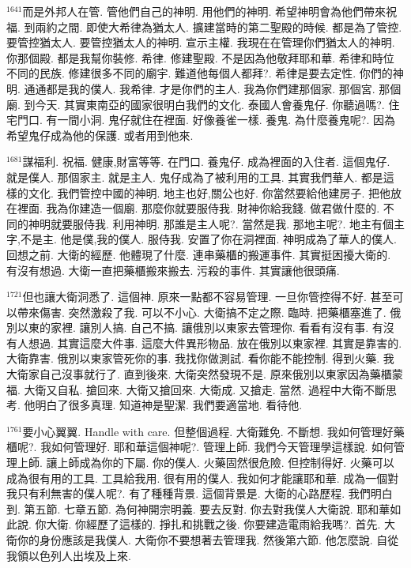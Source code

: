 \documentclass{book}
\begin{document}
$^{1641}$而是外邦人在管.
管他們自己的神明.
用他們的神明.
希望神明會為他們帶來祝福.
到兩約之間.
即使大希律為猶太人.
擴建當時的第二聖殿的時候.
都是為了管控.
要管控猶太人.
要管控猶太人的神明.
宣示主權.
我現在在管理你們猶太人的神明.
你那個殿.
都是我幫你裝修.
希律.
修建聖殿.
不是因為他敬拜耶和華.
希律和時位不同的民族.
修建很多不同的廟宇.
難道他每個人都拜?.
希律是要去定性.
你們的神明.
通通都是我的僕人.
我希律.
才是你們的主人.
我為你們建那個家.
那個宮.
那個廟.
到今天.
其實東南亞的國家很明白我們的文化.
泰國人會養鬼仔.
你聽過嗎?.
住宅門口.
有一間小洞.
鬼仔就住在裡面.
好像養雀一樣.
養鬼.
為什麼養鬼呢?.
因為希望鬼仔成為他的保護.
或者用到他來.

$^{1681}$謀福利.
祝福.
健康,財富等等.
在門口.
養鬼仔.
成為裡面的入住者.
這個鬼仔.
就是僕人.
那個家主.
就是主人.
鬼仔成為了被利用的工具.
其實我們華人.
都是這樣的文化.
我們管控中國的神明.
地主也好,關公也好.
你當然要給他建房子.
把他放在裡面.
我為你建造一個廟.
那麼你就要服侍我.
財神你給我錢.
做君做什麼的.
不同的神明就要服侍我.
利用神明.
那誰是主人呢?.
當然是我.
那地主呢?.
地主有個主字,不是主.
他是僕,我的僕人.
服侍我.
安置了你在洞裡面.
神明成為了華人的僕人.
回想之前.
大衛的經歷.
他體現了什麼.
連串藥櫃的搬運事件.
其實挺困擾大衛的.
有沒有想過.
大衛一直把藥櫃搬來搬去.
污殺的事件.
其實讓他很頭痛.

$^{1721}$但也讓大衛洞悉了.
這個神.
原來一點都不容易管理.
一旦你管控得不好.
甚至可以帶來傷害.
突然激殺了我.
可以不小心.
大衛搞不定之際.
臨時.
把藥櫃塞進了.
俄別以東的家裡.
讓別人搞.
自己不搞.
讓俄別以東家去管理你.
看看有沒有事.
有沒有人想過.
其實這麼大件事.
這麼大件異形物品.
放在俄別以東家裡.
其實是靠害的.
大衛靠害.
俄別以東家管死你的事.
我找你做測試.
看你能不能控制.
得到火藥.
我大衛家自己沒事就行了.
直到後來.
大衛突然發現不是.
原來俄別以東家因為藥櫃蒙福.
大衛又自私.
搶回來.
大衛又搶回來.
大衛成.
又搶走.
當然.
過程中大衛不斷思考.
他明白了很多真理.
知道神是聖潔.
我們要適當地.
看待他.

$^{1761}$要小心翼翼.
Handle with care.
但整個過程.
大衛難免.
不斷想.
我如何管理好藥櫃呢?.
我如何管理好.
耶和華這個神呢?.
管理上師.
我們今天管理學這樣說.
如何管理上師.
讓上師成為你的下屬.
你的僕人.
火藥固然很危險.
但控制得好.
火藥可以成為很有用的工具.
工具給我用.
很有用的僕人.
我如何才能讓耶和華.
成為一個對我只有利無害的僕人呢?.
有了種種背景.
這個背景是.
大衛的心路歷程.
我們明白到.
第五節.
七章五節.
為何神開宗明義.
要去反對.
你去對我僕人大衛說.
耶和華如此說.
你大衛.
你經歷了這樣的.
掙扎和挑戰之後.
你要建造電雨給我嗎?.
首先.
大衛你的身份應該是我僕人.
大衛你不要想著去管理我.
然後第六節.
他怎麼說.
自從我領以色列人出埃及上來.
\end{document}
